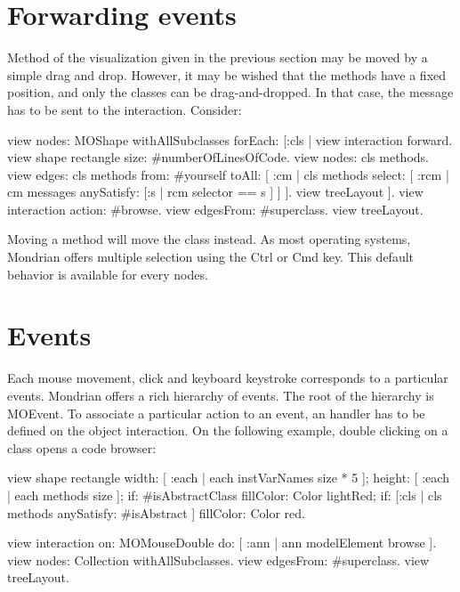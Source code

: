 \documentclass[a4paper,10pt,twoside]{book}
\begin{document}
\section{Forwarding events}

Method of the visualization given in the previous section may be moved by a simple drag and drop. However, it may be wished that the methods have a fixed position, and only the classes can be drag-and-dropped. In that case, the message  has to be sent to the interaction. Consider:

\begin{code}{}
view nodes: MOShape withAllSubclasses forEach: [:cls |
	view interaction forward.
	view shape rectangle 
					size: #numberOfLinesOfCode.
	view nodes: cls methods.
	view edges: cls methods from: #yourself toAll: [ :cm | cls methods select: [ :rcm |  cm messages anySatisfy: [:s | rcm selector == s ] ] ].
	view treeLayout
].
view interaction action: #browse.
view edgesFrom: #superclass.
view treeLayout.
\end{code}

Moving a method will move the class instead. As most operating systems, Mondrian offers multiple selection using the Ctrl or Cmd key. This default behavior is available for every nodes.


\section{Events}

Each mouse movement, click and keyboard keystroke corresponds to a particular events. Mondrian offers a rich hierarchy of events. The root of the hierarchy is MOEvent. To associate a particular action to an event, an handler has to be defined on the object interaction. On the following example, double clicking on a class opens a code browser:

\begin{code}{}
view shape rectangle
  width: [ :each | each instVarNames size * 5 ];
  height: [ :each | each methods size ];
  if: #isAbstractClass fillColor: Color lightRed;
  if: [:cls | cls methods anySatisfy: #isAbstract ] fillColor: Color red.
  
view interaction on: MOMouseDouble do: [ :ann | 
  ann modelElement browse
].
view nodes: Collection withAllSubclasses.
view edgesFrom: #superclass.
view treeLayout.
\end{code}
\end{document}
